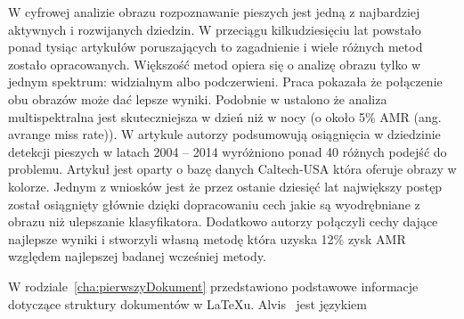 W cyfrowej analizie obrazu rozpoznawanie pieszych jest jedną z najbardziej aktywnych i rozwijanych dziedzin. W przeciągu kilkudziesięciu lat powstało ponad tysiąc artykułów poruszających to zagadnienie \cite{zhang2015filtered} i wiele różnych metod zostało opracowanych. Większość metod opiera się o analizę obrazu tylko w jednym spektrum: widzialnym albo podczerwieni. Praca \cite{hwang2015multispectral} pokazała że połączenie obu obrazów może dać lepsze wyniki. Podobnie w \cite{gonzalez2016pedestrian} ustalono że analiza multispektralna jest skuteczniejsza w dzień niż w nocy (o około 5\% AMR (ang. avrange miss rate)).   W artykule \cite{benenson2014ten} autorzy podsumowują osiągnięcia w dziedzinie detekcji pieszych w latach 2004 – 2014 wyróżniono ponad 40 różnych podejść do problemu. Artykuł jest oparty o bazę danych Caltech-USA która oferuje obrazy w kolorze. Jednym z wniosków jest że przez ostanie dziesięć lat największy postęp został osiągnięty głównie dzięki dopracowaniu cech jakie są wyodrębniane z obrazu niż ulepszanie klasyfikatora. Dodatkowo autorzy połączyli cechy dające najlepsze wyniki i stworzyli własną metodę która uzyska 12\% zysk AMR względem  najlepszej badanej wcześniej metody.

W rodziale~\ref{cha:pierwszyDokument} przedstawiono podstawowe informacje dotyczące struktury dokumentów w \LaTeX u. Alvis~\cite{Alvis2011} jest językiem 



















